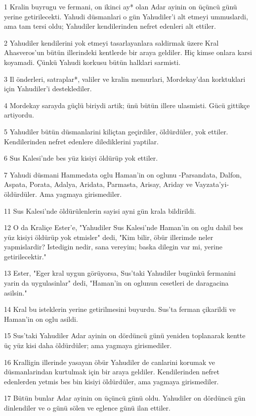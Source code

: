 \par 1 Kralin buyrugu ve fermani, on ikinci ay* olan Adar ayinin on üçüncü günü yerine getirilecekti. Yahudi düsmanlari o gün Yahudiler'i alt etmeyi ummuslardi, ama tam tersi oldu; Yahudiler kendilerinden nefret edenleri alt ettiler.
\par 2 Yahudiler kendilerini yok etmeyi tasarlayanlara saldirmak üzere Kral Ahasveros'un bütün illerindeki kentlerde bir araya geldiler. Hiç kimse onlara karsi koyamadi. Çünkü Yahudi korkusu bütün halklari sarmisti.
\par 3 Il önderleri, satraplar*, valiler ve kralin memurlari, Mordekay'dan korktuklari için Yahudiler'i desteklediler.
\par 4 Mordekay sarayda güçlü biriydi artik; ünü bütün illere ulasmisti. Gücü gittikçe artiyordu.
\par 5 Yahudiler bütün düsmanlarini kiliçtan geçirdiler, öldürdüler, yok ettiler. Kendilerinden nefret edenlere dilediklerini yaptilar.
\par 6 Sus Kalesi'nde bes yüz kisiyi öldürüp yok ettiler.
\par 7 Yahudi düsmani Hammedata oglu Haman'in on oglunu -Parsandata, Dalfon, Aspata, Porata, Adalya, Aridata, Parmasta, Arisay, Ariday ve Vayzata'yi- öldürdüler. Ama yagmaya girismediler.
\par 11 Sus Kalesi'nde öldürülenlerin sayisi ayni gün krala bildirildi.
\par 12 O da Kraliçe Ester'e, "Yahudiler Sus Kalesi'nde Haman'in on oglu dahil bes yüz kisiyi öldürüp yok etmisler" dedi, "Kim bilir, öbür illerimde neler yapmislardir? Istedigin nedir, sana vereyim; baska dilegin var mi, yerine getirilecektir."
\par 13 Ester, "Eger kral uygun görüyorsa, Sus'taki Yahudiler bugünkü fermanini yarin da uygulasinlar" dedi, "Haman'in on oglunun cesetleri de daragacina asilsin."
\par 14 Kral bu isteklerin yerine getirilmesini buyurdu. Sus'ta ferman çikarildi ve Haman'in on oglu asildi.
\par 15 Sus'taki Yahudiler Adar ayinin on dördüncü günü yeniden toplanarak kentte üç yüz kisi daha öldürdüler; ama yagmaya girismediler.
\par 16 Kralligin illerinde yasayan öbür Yahudiler de canlarini korumak ve düsmanlarindan kurtulmak için bir araya geldiler. Kendilerinden nefret edenlerden yetmis bes bin kisiyi öldürdüler, ama yagmaya girismediler.
\par 17 Bütün bunlar Adar ayinin on üçüncü günü oldu. Yahudiler on dördüncü gün dinlendiler ve o günü sölen ve eglence günü ilan ettiler.

